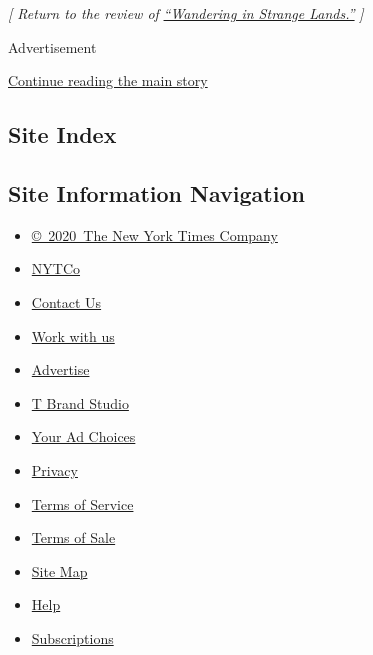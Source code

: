 \emph{{[} Return to the review of}
\href{https://www.nytimes3xbfgragh.onion/2020/08/03/books/review/wandering-in-strange-lands-morgan-jerkins.html}{\emph{``Wandering
in Strange Lands.''}} \emph{{]}}

Advertisement

\protect\hyperlink{after-bottom}{Continue reading the main story}

\hypertarget{site-index}{%
\subsection{Site Index}\label{site-index}}

\hypertarget{site-information-navigation}{%
\subsection{Site Information
Navigation}\label{site-information-navigation}}

\begin{itemize}
\tightlist
\item
  \href{https://help.nytimes3xbfgragh.onion/hc/en-us/articles/115014792127-Copyright-notice}{©~2020~The
  New York Times Company}
\end{itemize}

\begin{itemize}
\tightlist
\item
  \href{https://www.nytco.com/}{NYTCo}
\item
  \href{https://help.nytimes3xbfgragh.onion/hc/en-us/articles/115015385887-Contact-Us}{Contact
  Us}
\item
  \href{https://www.nytco.com/careers/}{Work with us}
\item
  \href{https://nytmediakit.com/}{Advertise}
\item
  \href{http://www.tbrandstudio.com/}{T Brand Studio}
\item
  \href{https://www.nytimes3xbfgragh.onion/privacy/cookie-policy\#how-do-i-manage-trackers}{Your
  Ad Choices}
\item
  \href{https://www.nytimes3xbfgragh.onion/privacy}{Privacy}
\item
  \href{https://help.nytimes3xbfgragh.onion/hc/en-us/articles/115014893428-Terms-of-service}{Terms
  of Service}
\item
  \href{https://help.nytimes3xbfgragh.onion/hc/en-us/articles/115014893968-Terms-of-sale}{Terms
  of Sale}
\item
  \href{https://spiderbites.nytimes3xbfgragh.onion}{Site Map}
\item
  \href{https://help.nytimes3xbfgragh.onion/hc/en-us}{Help}
\item
  \href{https://www.nytimes3xbfgragh.onion/subscription?campaignId=37WXW}{Subscriptions}
\end{itemize}
